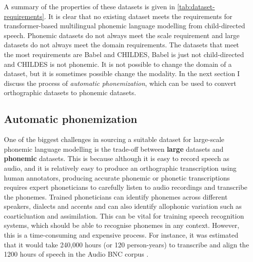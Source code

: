A summary of the properties of these datasets is given in \cref{tab:dataset-requirements}. It is clear that no existing dataset meets the requirements for transformer-based multilingual phonemic language modelling from child-directed speech. Phonemic datasets do not always meet the scale requirement and large datasets do not always meet the domain requirements. The datasets that meet the most requirements are Babel and CHILDES, Babel is just not child-directed and CHILDES is not phonemic. It is not possible to change the domain of a dataset, but it is sometimes possible change the modality. In the next section I discuss the process of \textit{automatic phonemization}, which can be used to convert orthographic datasets to phonemic datasets. 

\subsection{Automatic phonemization}
\label{sec:dataset-phonemization}



One of the biggest challenges in sourcing a suitable dataset for large-scale phonemic language modelling is the trade-off between \textbf{large} datasets and \textbf{phonemic} datasets. This is because although it is easy to record speech as audio, and it is relatively easy to produce an orthographic transcription using human annotators, producing accurate phonemic or phonetic transcriptions requires expert phoneticians to carefully listen to audio recordings and transcribe the phonemes. Trained phoneticians can identify phonemes across different speakers, dialects and accents and can also identify allophonic variation such as coarticluation and assimilation. This can be vital for training speech recognition systems, which should be able to recognise phonemes in any context. However, this is a time-consuming and expensive process. For instance, it was estimated that it would take 240,000 hours (or 120 person-years) to transcribe and align the 1200 hours of speech in the Audio BNC corpus \citep{coleman2011mining}. 

